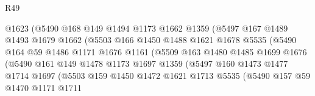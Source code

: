\begin{lexlean}{R49}
\begin{coremodule}
                            @1623
                            (@5490
                              @168
                              @149
                              @1494
                              @1173
                              @1662
                              @1359
                              (@5497
                                @167
                                @1489
                                @1493
                                @1679
                                @1662
                                (@5503
                                  @166
                                  @1450
                                  @1488
                                  @1621
                                  @1678
                                  @5535
                                  (@5490
                                    @164
                                    @59
                                    @1486
                                    @1171
                                    @1676
                                    @1161
                                    (@5509
                                      @163
                                      @1480
                                      @1485
                                      @1699
                                      @1676
                                      (@5490
                                        @161
                                        @149
                                        @1478
                                        @1173
                                        @1697
                                        @1359
                                        (@5497
                                          @160
                                          @1473
                                          @1477
                                          @1714
                                          @1697
                                          (@5503
                                            @159
                                            @1450
                                            @1472
                                            @1621
                                            @1713
                                            @5535
                                            (@5490
                                              @157
                                              @59
                                              @1470
                                              @1171
                                              @1711

\end{coremodule}
\end{lexlean}
